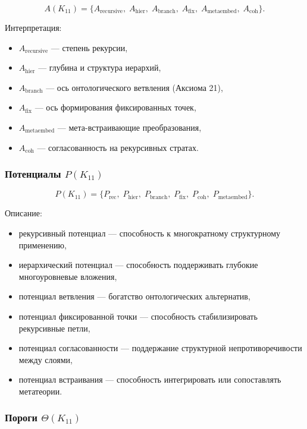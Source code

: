 \[
A(K_{11}) =
\{
A_{\mathrm{recursive}},\;
A_{\mathrm{hier}},\;
A_{\mathrm{branch}},\;
A_{\mathrm{fix}},\;
A_{\mathrm{metaembed}},\;
A_{\mathrm{coh}}
\}.
\]

Интерпретация:
\begin{itemize}
    \item $A_{\mathrm{recursive}}$ — степень рекурсии,
    \item $A_{\mathrm{hier}}$ — глубина и структура иерархий,
    \item $A_{\mathrm{branch}}$ — ось онтологического ветвления (Аксиома 21),
    \item $A_{\mathrm{fix}}$ — ось формирования фиксированных точек,
    \item $A_{\mathrm{metaembed}}$ — мета-встраивающие преобразования,
    \item $A_{\mathrm{coh}}$ — согласованность на рекурсивных стратах.
\end{itemize}

\subsubsection{Потенциалы $P(K_{11})$}

\[
P(K_{11})=
\{
P_{\mathrm{rec}},\;
P_{\mathrm{hier}},\;
P_{\mathrm{branch}},\;
P_{\mathrm{fix}},\;
P_{\mathrm{coh}},\;
P_{\mathrm{metaembed}}
\}.
\]

Описание:
\begin{itemize}
    \item рекурсивный потенциал — способность к многократному структурному применению,
    \item иерархический потенциал — способность поддерживать глубокие многоуровневые вложения,
    \item потенциал ветвления — богатство онтологических альтернатив,
    \item потенциал фиксированной точки — способность стабилизировать рекурсивные петли,
    \item потенциал согласованности — поддержание структурной непротиворечивости между слоями,
    \item потенциал встраивания — способность интегрировать или сопоставлять метатеории.
\end{itemize}

\subsubsection{Пороги $\Theta(K_{11})$}

